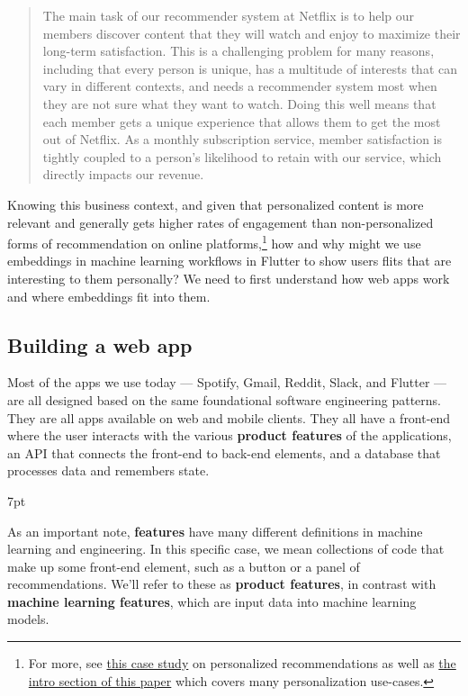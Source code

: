 \documentclass[11pt, table]{diazessay} %
\newenvironment{formal}{%
  \def\FrameCommand{%
	\hspace{1pt}%
	{\color{w_lightblue}\vrule width 2pt}%
	{\color{formalshade}\vrule width 4pt}%
	\colorbox{formalshade}%
  }%
  \MakeFramed{\advance\hsize-\width\FrameRestore}%
  \noindent\hspace{-4.55pt}%
  \begin{adjustwidth}{}{7pt}%
  \vspace{2pt}\vspace{2pt}%
}
{%
  \vspace{2pt}\end{adjustwidth}\endMakeFramed%
}
\begin{document}
\begin{sloppypar}
\begin{quote}

The main task of our recommender system at Netflix is to help our members discover content that they will watch and enjoy to maximize their long-term satisfaction. This is a challenging problem for many reasons, including that every person is unique, has a multitude of interests that can vary in different contexts, and needs a recommender system most when they are not sure what they want to watch. Doing this well means that each member gets a unique experience that allows them to get the most out of Netflix. As a monthly subscription service, member satisfaction is tightly coupled to a person’s likelihood to retain with our service, which directly impacts our revenue.
\end{quote}

Knowing this business context, and given that personalized content is more relevant and generally gets higher rates of engagement \citep{jannach2010recommender} than non-personalized forms of recommendation on online platforms,\footnote{For more, see  \href{http://www.recommenderbook.net/media/Recommender_Systems_An_Introduction_Chapter08_Case_study.pdf}{this case study} on personalized recommendations as well as \href{https://www.arxiv-vanity.com/papers/1906.03109/}{the intro section of this paper} which covers many personalization use-cases.}  how and why might we use embeddings in machine learning workflows in Flutter to show users flits that are interesting to them personally? We need to first understand how web apps work and where embeddings fit into them.

\subsection{Building a web app}

 Most of the apps we use today --- Spotify, Gmail, Reddit, Slack, and Flutter --- are all designed based on the same foundational software engineering patterns. They are all apps available on web and mobile clients. They all have a front-end where the user interacts with the various \textbf{product features} of the applications, an API that connects the front-end to back-end elements, and a database that processes data and remembers state.
 
 \begin{formal}
 As an important note, \textbf{features} have many different definitions in machine learning and engineering. In this specific case, we mean collections of code that make up some front-end element, such as a button or a panel of recommendations. We'll refer to these as \textbf{product features}, in contrast with \textbf{machine learning features}, which are input data into machine learning models.
  \end{formal}
 

\end{sloppypar}
\end{document}

